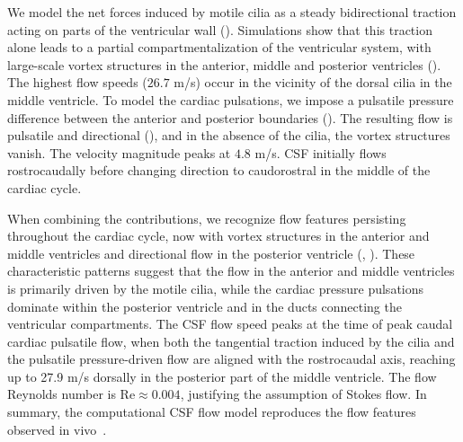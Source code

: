 \documentclass{WileyMSP-template}
\begin{document}
We model the net forces induced by motile cilia as a steady
bidirectional traction acting on parts of the ventricular wall
(). Simulations show that this traction alone
leads to a partial compartmentalization of the ventricular system,
with large-scale vortex structures in the anterior, middle and
posterior ventricles (). The highest flow
speeds ($26.7$ \textmu m/s) occur in the vicinity of the dorsal cilia
in the middle ventricle. To model the cardiac pulsations, we impose a
pulsatile pressure difference between the anterior and posterior
boundaries (). The resulting flow
is pulsatile and directional (), and
in the absence of the cilia, the vortex structures vanish. The
velocity magnitude peaks at $4.8$ \textmu m/s. CSF initially flows
rostrocaudally before changing direction to caudorostral in the middle
of the cardiac cycle.

When combining the contributions, we recognize flow features
persisting throughout the cardiac cycle, now with vortex structures in
the anterior and middle ventricles and directional flow in the
posterior ventricle (, ). These characteristic patterns suggest that the flow in
the anterior and middle ventricles is primarily driven by the motile
cilia, while the cardiac pressure pulsations dominate within the
posterior ventricle and in the ducts connecting the ventricular
compartments. The CSF flow speed peaks at the time of peak caudal
cardiac pulsatile flow, when both the tangential traction induced by
the cilia and the pulsatile pressure-driven flow are aligned with the
rostrocaudal axis, reaching up to 27.9 \textmu m/s dorsally in the
posterior part of the middle ventricle. The flow Reynolds number is
$\mathrm{Re} \approx 0.004$, justifying the assumption of Stokes
flow. In summary, the computational CSF flow model reproduces the flow
features observed in vivo~\cite{Olstad2019CiliaryDevelopment}.
\end{document}
